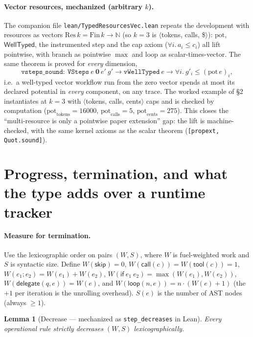 \documentclass[11pt]{article}
\theoremstyle{plain}
\newtheorem*{lemmaU}{Lemma}
\newcommand{\kw}[1]{\mathsf{#1}}                      %
\newcommand{\pot}{\mathrm{pot}}
\begin{document}
\paragraph{Vector resources, mechanized (arbitrary $k$).} The companion file
\texttt{lean/TypedResourcesVec.lean} repeats the development with resources as vectors
$\mathrm{Res}\,k = \mathrm{Fin}\,k \to \mathbb{N}$ (so $k=3$ is $\langle$tokens, calls, \$$\rangle$):
$\pot$, $\kw{WellTyped}$, the instrumented step and the cap axiom ($\forall i.\,a_i \le c_i$) all
lift pointwise, with branch as pointwise $\max$ and loop as scalar-times-vector. The same theorem
is proved for \emph{every} dimension,
\[
  \texttt{vsteps\_sound} :\ \texttt{VSteps}\ e\ \mathbf{0}\ e'\ g' \to \texttt{vWellTyped}\ e \to
  \forall i.\ g'_i \le (\pot\, e)_i,
\]
i.e.\ a well-typed vector workflow run from the zero vector spends at most its declared potential in
\emph{every} component, on any trace. The worked example of \S2 instantiates at $k=3$ with
$\langle$tokens, calls, cents$\rangle$ caps and is checked by computation
($\pot_{\text{tokens}} = 16000$, $\pot_{\text{calls}} = 5$, $\pot_{\text{cents}} = 275$). This
closes the ``multi-resource is only a pointwise paper extension'' gap: the lift is machine-checked,
with the same kernel axioms as the scalar theorem (\texttt{[propext, Quot.sound]}).

\section{Progress, termination, and what the type adds over a runtime tracker}

\paragraph{Measure for termination.}
Use the lexicographic order on pairs $(W, S)$, where $W$ is fuel-weighted work and $S$ is syntactic
size. Define $W(\kw{skip}) = 0$, $W(\kw{call}(c)) = W(\kw{tool}(c)) = 1$,
$W(e_1 ; e_2) = W(e_1) + W(e_2)$, $W(\kw{if}\ e_1\ e_2) = \max(W(e_1), W(e_2))$,
$W(\kw{delegate}(q, e)) = W(e)$, and $W(\kw{loop}(n, e)) = n \cdot (W(e) + 1)$ (the $+1$ per
iteration is the unrolling overhead). $S(e)$ is the number of AST nodes (always $\ge 1$).

\begin{lemmaU}[Decrease --- mechanized as \texttt{step\_decreases} in Lean]
Every operational rule strictly decreases $(W, S)$ lexicographically.
\end{lemmaU}
\end{document}
